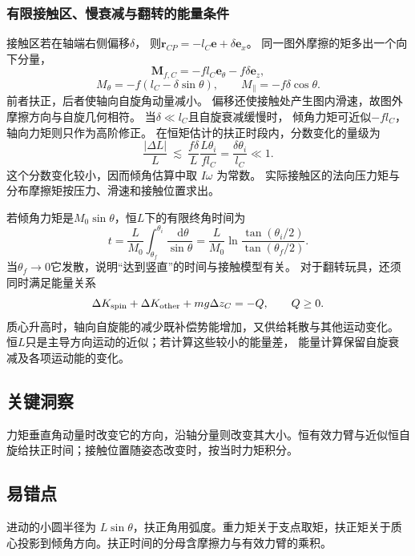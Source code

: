 \documentclass[UTF8,fontset=fandol,a4paper,11pt]{ctexart}
\newcommand{\dd}{\mathop{}\!\mathrm{d}}
\begin{document}
\subsubsection*{有限接触区、慢衰减与翻转的能量条件}
接触区若在轴端右侧偏移$\delta$，
则$\boldsymbol r_{CP}=-l_C\boldsymbol e+\delta\boldsymbol e_x$。
同一图外摩擦的矩多出一个向下分量，
\[
\boldsymbol M_{f,C}= -fl_C\boldsymbol e_\theta-f\delta\boldsymbol e_z,
\]
\[
M_\theta=-f(l_C-\delta\sin\theta),\qquad
M_\parallel=-f\delta\cos\theta.
\]
前者扶正，后者使轴向自旋角动量减小。
偏移还使接触处产生图内滑速，故图外摩擦方向与自旋几何相符。
当$\delta\ll l_C$且自旋衰减缓慢时，
倾角力矩可近似$-fl_C$，轴向力矩则只作为高阶修正。
在恒矩估计的扶正时段内，分数变化的量级为
\[
\frac{|\Delta L|}{L}\ \lesssim\
\frac{f\delta}{L}\frac{L\theta_i}{fl_C}
=\frac{\delta\theta_i}{l_C}\ll1.
\]
这个分数变化较小，因而倾角估算中取 $I\omega$ 为常数。
实际接触区的法向压力矩与分布摩擦矩按压力、滑速和接触位置求出。

若倾角力矩是$M_0\sin\theta$，恒$L$下的有限终角时间为
\[
t=\frac L{M_0}\int_{\theta_f}^{\theta_i}\frac{\dd\theta}{\sin\theta}
=\frac L{M_0}\ln\frac{\tan(\theta_i/2)}{\tan(\theta_f/2)}.
\]
当$\theta_f\to0$它发散，说明“达到竖直”的时间与接触模型有关。
对于翻转玩具，还须同时满足能量关系
\[
\Delta K_{\rm spin}+\Delta K_{\rm other}+mg\Delta z_C=-Q,\qquad Q\geq0.
\]
质心升高时，轴向自旋能的减少既补偿势能增加，又供给耗散与其他运动变化。
恒$L$只是主导方向运动的近似；若计算这些较小的能量差，
能量计算保留自旋衰减及各项运动能的变化。




\subsection*{关键洞察}

力矩垂直角动量时改变它的方向，沿轴分量则改变其大小。恒有效力臂与近似恒自旋给扶正时间；接触位置随姿态改变时，按当时力矩积分。



\subsection*{易错点}

进动的小圆半径为 $L\sin\theta$，扶正角用弧度。重力矩关于支点取矩，扶正矩关于质心投影到倾角方向。扶正时间的分母含摩擦力与有效力臂的乘积。
\end{document}
